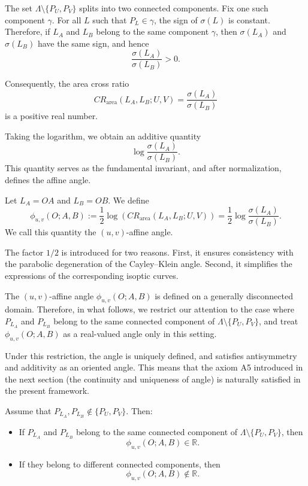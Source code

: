 \documentclass[12pt]{article}
\begin{document}
The set $\Lambda\setminus\{P_U,P_V\}$ splits into two connected components.
Fix one such component $\gamma$.
For all $L$ such that $P_L \in \gamma$, the sign of $\sigma(L)$ is constant.
Therefore, if $L_A$ and $L_B$ belong to the same component $\gamma$,
then $\sigma(L_A)$ and $\sigma(L_B)$ have the same sign, and hence
\[
\frac{\sigma(L_A)}{\sigma(L_B)}>0.
\]

Consequently, the area cross ratio
\[
CR_{\mathrm{area}}(L_A,L_B;U,V)
=
\frac{\sigma(L_A)}{\sigma(L_B)}
\]
is a positive real number.

Taking the logarithm, we obtain an additive quantity
\[
\log\frac{\sigma(L_A)}{\sigma(L_B)}.
\]
This quantity serves as the fundamental invariant,
and after normalization, defines the affine angle.

\begin{definition}
\label{def:affine-angle-acr}
Let $L_A=OA$ and $L_B=OB$.
We define
\[
\phi_{u,v}(O;A,B)
:=
\frac{1}{2}\log\!\left(
CR_{\mathrm{area}}(L_A,L_B;U,V)
\right)
=
\frac{1}{2}\log\!\frac{\sigma(L_A)}{\sigma(L_B)}.
\]
We call this quantity the $(u,v)$-affine angle.
\end{definition}


\begin{remark}
The factor $1/2$ is introduced for two reasons.
First, it ensures consistency with the parabolic degeneration
of the Cayley--Klein angle.
Second, it simplifies the expressions of the corresponding isoptic curves.
\end{remark}


The $(u,v)$-affine angle $\phi_{u,v}(O;A,B)$
is defined on a generally disconnected domain.
Therefore, in what follows,
we restrict our attention to the case where
$P_{L_A}$ and $P_{L_B}$ belong to the same connected component of
$\Lambda\setminus\{P_U,P_V\}$,
and treat $\phi_{u,v}(O;A,B)$ as a real-valued angle only in this setting.

Under this restriction,
the angle is uniquely defined,
and satisfies antisymmetry and additivity as an oriented angle.
This means that the axiom A5 introduced in the next section
(the continuity and uniqueness of angle)
is naturally satisfied in the present framework.


\begin{proposition}
\label{prop:real-uv-affine-angle}
Assume that $P_{L_A},P_{L_B}\notin\{P_U,P_V\}$.
Then:
\begin{itemize}
\item If $P_{L_A}$ and $P_{L_B}$ belong to the same connected component of
$\Lambda\setminus\{P_U,P_V\}$, then
\[
\phi_{u,v}(O;A,B)\in\mathbb R.
\]

\item If they belong to different connected components, then
\[
\phi_{u,v}(O;A,B)\notin\mathbb R.
\]
\end{itemize}
\end{proposition}
\end{document}
